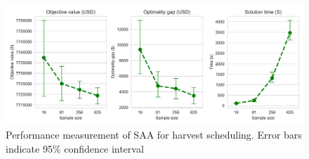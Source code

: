 \documentclass[forests,article,submit,moreauthors,pdftex]{Definitions/mdpi}
\begin{document}
\begin{figure}[hb!]
    \centering
    \includegraphics[width=1\linewidth]{sol_gap_time.png}
    \caption{Performance measurement of SAA for harvest scheduling. Error bars indicate 95\% confidence interval }
    \label{fig:saa_performance}
\end{figure}
 
 


\end{document}
